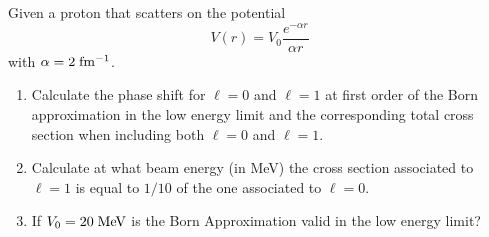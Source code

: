 \newpage
\setcounter{equation}{0}

\begin{esercizio}
   Given a proton that scatters on the potential
   \begin{equation*}
      V(r)
      =V_0 \frac{e^{-\alpha r}}{\alpha r}
   \end{equation*}
   with $\alpha=2 \; \rm fm^{-1}$.
   \begin{enumerate}[label=\alph*), leftmargin=0.6cm]
      \item Calculate the phase shift for $\ell=0$ and $\ell=1$ at first order of the Born approximation in the low energy limit and the corresponding total cross section when including both $\ell=0$ and $\ell=1$.
      \item Calculate at what beam energy (in MeV) the cross section associated to $\ell=1$ is equal to $1/10$ of the one associated to $\ell=0$.
      \item If $V_0=20 \rm \; MeV$ is the Born Approximation valid in the low energy limit?
   \end{enumerate}
\end{esercizio}
